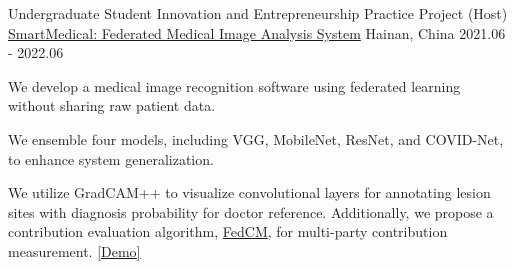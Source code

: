 \begin{cventries}
\cventry
{Undergraduate Student Innovation and Entrepreneurship Practice Project (Host)} %
{\href{https://www.bj-yan.top/paddle-fl-gui/}{SmartMedical: Federated Medical Image Analysis System}} %
{Hainan, China} %
{2021.06 - 2022.06} %
{
    \begin{cvitems}
        \item {We develop a medical image recognition software using federated learning without sharing raw patient data.}
        \item {We ensemble four models, including VGG, MobileNet, ResNet, and COVID-Net, to enhance system generalization.}
        \item {We utilize GradCAM++ to visualize convolutional layers for annotating lesion sites with diagnosis probability for doctor reference. 
            Additionally, we propose a contribution evaluation algorithm, \href{https://ieeexplore.ieee.org/abstract/document/9534451/}{FedCM}, for multi-party contribution measurement.
            \textcolor{awesome-red}{\href{https://www.bj-yan.top/paddle-fl-gui/}{[Demo]}}
        }
    \end{cvitems}
}



\end{cventries}




